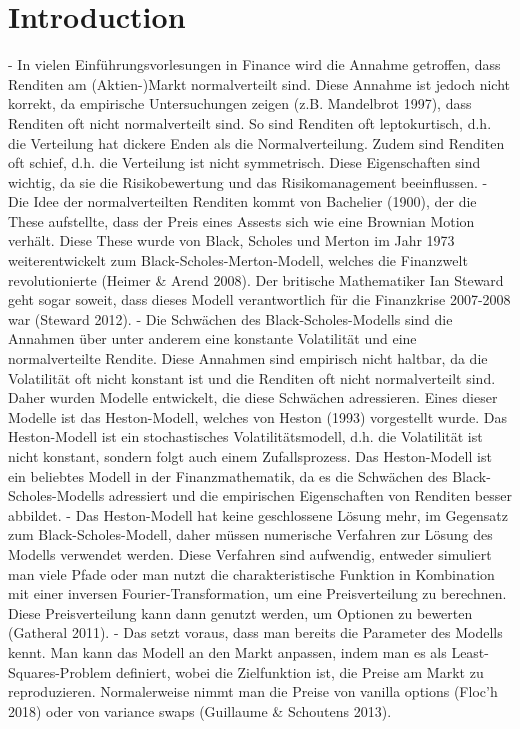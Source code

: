 \section{Introduction}

- In vielen Einführungsvorlesungen in Finance wird die Annahme getroffen, dass Renditen am (Aktien-)Markt normalverteilt sind. Diese Annahme ist jedoch nicht korrekt, da empirische Untersuchungen zeigen (z.B. Mandelbrot 1997), dass Renditen oft nicht normalverteilt sind. So sind Renditen oft leptokurtisch, d.h. die Verteilung hat dickere Enden als die Normalverteilung. Zudem sind Renditen oft schief, d.h. die Verteilung ist nicht symmetrisch. Diese Eigenschaften sind wichtig, da sie die Risikobewertung und das Risikomanagement beeinflussen.
- Die Idee der normalverteilten Renditen kommt von Bachelier (1900), der die These aufstellte, dass der Preis eines Assests sich wie eine Brownian Motion verhält. Diese These wurde von Black, Scholes und Merton im Jahr 1973 weiterentwickelt zum Black-Scholes-Merton-Modell, welches die Finanzwelt revolutionierte (Heimer & Arend 2008). Der britische Mathematiker Ian Steward geht sogar soweit, dass dieses Modell verantwortlich für die Finanzkrise 2007-2008 war (Steward 2012).
- Die Schwächen des Black-Scholes-Modells sind die Annahmen über unter anderem eine konstante Volatilität und eine normalverteilte Rendite. Diese Annahmen sind empirisch nicht haltbar, da die Volatilität oft nicht konstant ist und die Renditen oft nicht normalverteilt sind. Daher wurden Modelle entwickelt, die diese Schwächen adressieren. Eines dieser Modelle ist das Heston-Modell, welches von Heston (1993) vorgestellt wurde. Das Heston-Modell ist ein stochastisches Volatilitätsmodell, d.h. die Volatilität ist nicht konstant, sondern folgt auch einem Zufallsprozess. Das Heston-Modell ist ein beliebtes Modell in der Finanzmathematik, da es die Schwächen des Black-Scholes-Modells adressiert und die empirischen Eigenschaften von Renditen besser abbildet.
- Das Heston-Modell hat keine geschlossene Lösung mehr, im Gegensatz zum Black-Scholes-Modell, daher müssen numerische Verfahren zur Lösung des Modells verwendet werden. Diese Verfahren sind aufwendig, entweder simuliert man viele Pfade oder man nutzt die charakteristische Funktion in Kombination mit einer inversen Fourier-Transformation, um eine Preisverteilung zu berechnen. Diese Preisverteilung kann dann genutzt werden, um Optionen zu bewerten (Gatheral 2011).
- Das setzt voraus, dass man bereits die Parameter des Modells kennt. Man kann das Modell an den Markt anpassen, indem man es als Least-Squares-Problem definiert, wobei die Zielfunktion ist, die Preise am Markt zu reproduzieren. Normalerweise nimmt man die Preise von vanilla options (Floc'h 2018) oder von variance swaps (Guillaume & Schoutens 2013).